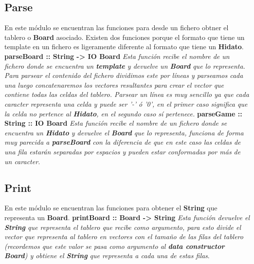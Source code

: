 \documentclass[12pt]{article}
\begin{document}
\subsection{Parse}
En este m\'odulo se encuentran las funciones para desde un fichero obtner el tablero o {\bf Board} asociado. Existen dos funciones porque el formato que tiene un template en un fichero es ligeramente
diferente al formato que tiene un {\bf Hidato}.
\newline \newline
{\bf parseBoard :: String -> IO Board}\newline
{\it Esta funci\'on recibe el nombre de un fichero donde se encuentra un {\bf template} y devuelve un {\bf Board} que lo representa. Para parsear el contenido del fichero dividimos este por l\'ineas y parseamos cada una luego concatenaremos los vectores 
resultantes para crear el vector que contiene todas las celdas del tablero. Parsear un l\'inea es muy sencillo ya que cada caracter representa una celda y puede ser '-' \'o '0', en el primer caso significa que la celda no pertence al {\bf Hidato}, en el segundo caso
s\'i pertenece.}
\newline \newline
{\bf parseGame :: String :: IO Board}\newline
{\it Esta funci\'on recibe el nombre de un fichero donde se encuentra un {\bf Hidato} y devuelve el {\bf Board} que lo representa, funciona de forma muy parecida a {\bf parseBoard} con la diferencia de que en este caso las celdas de una fila estar\'an separadas por espacios y pueden estar
conformadas por m\'as de un caracter.}
\newline \newline
\subsection{Print}
En este m\'odulo se encuentran las funciones para obtener el {\bf String} que representa un {\bf Board}.
\newline \newline
{\bf printBoard :: Board -> String}\newline
{\it Esta funci\'on devuelve el {\bf String} que representa el tablero que recibe como argumento, para esto divide el vector que representa al tablero en vectores con el tama\~no de las filas del tablero (recordemos que este valor se pasa como argumento al {\bf data constructor Board}) y obtiene el {\bf String} que representa a cada una de estas filas}.
\newline \newline
\end{document}
